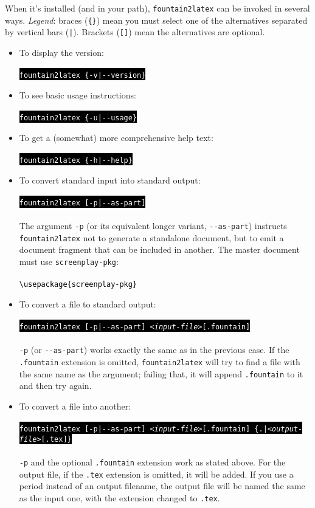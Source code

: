 \documentclass[11pt]{article}
\newcommand{\cmdline}[1]{    \hspace{0.5in}\colorbox{Black}{\textcolor{White}{\texttt{#1}}}}
\begin{document}
When it's installed (and in your path), \texttt{fountain2latex} can be
invoked in several ways. \emph{Legend}: braces (\texttt{\{\}}) mean you
must select one of the alternatives separated by vertical bars (\texttt{|}).
Brackets (\texttt{[]}) mean the alternatives are optional.
\begin{itemize}
  \item{To display the version:\\ \\
    \cmdline{fountain2latex \{-v|-{}-version\}}}\\
  \item{To see basic usage instructions:\\ \\
    \cmdline{fountain2latex \{-u|-{}-usage\}}}\\
  \item{To get a (somewhat) more comprehensive help text:\\ \\
    \cmdline{fountain2latex \{-h|-{}-help\}}}\\
  \item{To convert standard input into standard output:\\ \\
    \cmdline{fountain2latex [-p|-{}-as-part]}\\ \\
    The argument \texttt{-p} (or its equivalent longer variant, \texttt{-{}-as-part})
    instructs \texttt{fountain2latex} not to generate a standalone document,
    but to emit a document fragment that can be included in another. The master
    document must use \texttt{screenplay-pkg}:\\ \\
    \colorbox{Parchment}{\textcolor{Black}{\texttt{\textbackslash{}usepackage\{screenplay-pkg\}}}}}\\
  \item{To convert a file to standard output:\\ \\
    \cmdline{fountain2latex [-p|-{}-as-part] \emph{<input-file>}[.fountain]}\\ \\
    \texttt{-p} (or \texttt{-{}-as-part}) works exactly the same as in the previous
    case. If the \texttt{.fountain} extension is omitted, \texttt{fountain2latex}
    will try to find a file with the same name as the argument; failing that, it
    will append \texttt{.fountain} to it and then try again.}
  \item{To convert a file into another:\\ \\
    \cmdline{\scriptsize{fountain2latex [-p|-{}-as-part] \emph{<input-file>}[.fountain] \{.|\emph{<output-file>}[.tex]\}}}\\ \\
    \texttt{-p} and the optional \texttt{.fountain} extension work as
    stated above. For the output file, if the \texttt{.tex} extension
    is omitted, it will be added. If you use a period instead of an
    output filename, the output file will be named the same as the
    input one, with the extension changed to \texttt{.tex}.}
\end{itemize}
\end{document}
